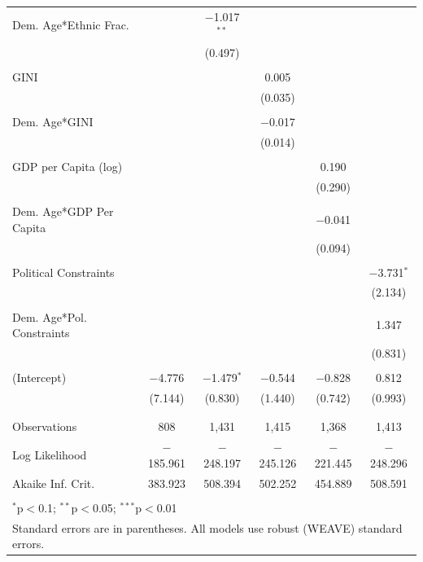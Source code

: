 \documentclass[a4paper]{article}\usepackage[]{graphicx}\usepackage[]{color}
\begin{document}
\begin{table}
\begin{center}
{\begin{tabular}{@{\extracolsep{5pt}}lccccc}
 Dem. Age*Ethnic Frac. &  & $-$1.017$^{**}$ &  &  &  \\ 
  &  & (0.497) &  &  &  \\ 
  & & & & & \\ 
 GINI &  &  & 0.005 &  &  \\ 
  &  &  & (0.035) &  &  \\ 
  & & & & & \\ 
 Dem. Age*GINI &  &  & $-$0.017 &  &  \\ 
  &  &  & (0.014) &  &  \\ 
  & & & & & \\ 
 GDP per Capita (log) &  &  &  & 0.190 &  \\ 
  &  &  &  & (0.290) &  \\ 
  & & & & & \\ 
 Dem. Age*GDP Per Capita &  &  &  & $-$0.041 &  \\ 
  &  &  &  & (0.094) &  \\ 
  & & & & & \\ 
 Political Constraints &  &  &  &  & $-$3.731$^{*}$ \\ 
  &  &  &  &  & (2.134) \\ 
  & & & & & \\ 
 Dem. Age*Pol. Constraints &  &  &  &  & 1.347 \\ 
  &  &  &  &  & (0.831) \\ 
  & & & & & \\ 
 (Intercept) & $-$4.776 & $-$1.479$^{*}$ & $-$0.544 & $-$0.828 & 0.812 \\ 
  & (7.144) & (0.830) & (1.440) & (0.742) & (0.993) \\ 
  & & & & & \\ 
\hline \\[-1.8ex] 
Observations & 808 & 1,431 & 1,415 & 1,368 & 1,413 \\ 
Log Likelihood & $-$185.961 & $-$248.197 & $-$245.126 & $-$221.445 & $-$248.296 \\ 
Akaike Inf. Crit. & 383.923 & 508.394 & 502.252 & 454.889 & 508.591 \\ 
\hline 
\hline \\[-1.8ex] 
\multicolumn{6}{l}{$^{*}$p$<$0.1; $^{**}$p$<$0.05; $^{***}$p$<$0.01} \\ 
\multicolumn{6}{l}{Standard errors are in parentheses. All models use robust (WEAVE) standard errors.} \\ 
\end{tabular} 

    }
    \end{center}
\end{table}
\end{document}
